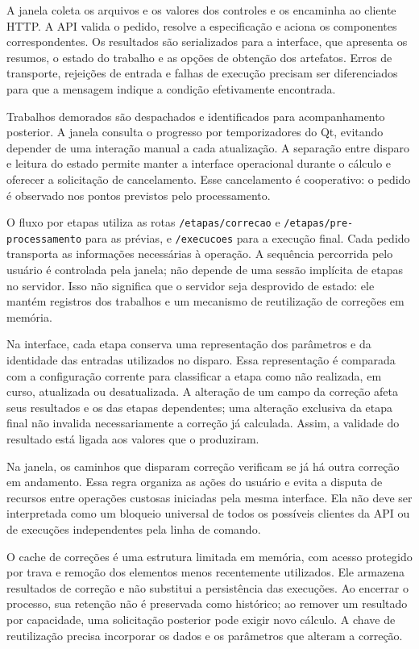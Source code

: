 A janela coleta os arquivos e os valores dos controles e os encaminha ao cliente HTTP. A API valida o pedido, resolve a especificação e aciona os componentes correspondentes. Os resultados são serializados para a interface, que apresenta os resumos, o estado do trabalho e as opções de obtenção dos artefatos. Erros de transporte, rejeições de entrada e falhas de execução precisam ser diferenciados para que a mensagem indique a condição efetivamente encontrada.

Trabalhos demorados são despachados e identificados para acompanhamento posterior. A janela consulta o progresso por temporizadores do Qt, evitando depender de uma interação manual a cada atualização. A separação entre disparo e leitura do estado permite manter a interface operacional durante o cálculo e oferecer a solicitação de cancelamento. Esse cancelamento é cooperativo: o pedido é observado nos pontos previstos pelo processamento.

O fluxo por etapas utiliza as rotas \texttt{/etapas/correcao} e \texttt{/etapas/pre-processamento} para as prévias, e \texttt{/execucoes} para a execução final. Cada pedido transporta as informações necessárias à operação. A sequência percorrida pelo usuário é controlada pela janela; não depende de uma sessão implícita de etapas no servidor. Isso não significa que o servidor seja desprovido de estado: ele mantém registros dos trabalhos e um mecanismo de reutilização de correções em memória.

Na interface, cada etapa conserva uma representação dos parâmetros e da identidade das entradas utilizados no disparo. Essa representação é comparada com a configuração corrente para classificar a etapa como não realizada, em curso, atualizada ou desatualizada. A alteração de um campo da correção afeta seus resultados e os das etapas dependentes; uma alteração exclusiva da etapa final não invalida necessariamente a correção já calculada. Assim, a validade do resultado está ligada aos valores que o produziram.

Na janela, os caminhos que disparam correção verificam se já há outra correção em andamento. Essa regra organiza as ações do usuário e evita a disputa de recursos entre operações custosas iniciadas pela mesma interface. Ela não deve ser interpretada como um bloqueio universal de todos os possíveis clientes da API ou de execuções independentes pela linha de comando.

O cache de correções é uma estrutura limitada em memória, com acesso protegido por trava e remoção dos elementos menos recentemente utilizados. Ele armazena resultados de correção e não substitui a persistência das execuções. Ao encerrar o processo, sua retenção não é preservada como histórico; ao remover um resultado por capacidade, uma solicitação posterior pode exigir novo cálculo. A chave de reutilização precisa incorporar os dados e os parâmetros que alteram a correção.

